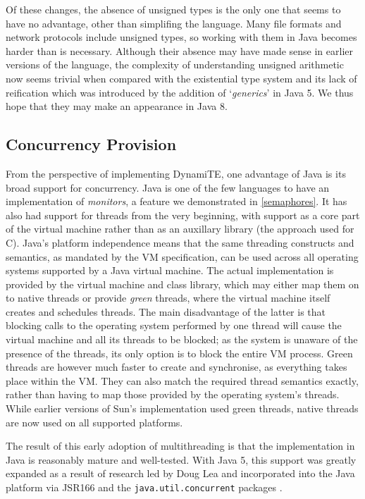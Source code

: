 Of these changes, the absence of unsigned types is the only one that
seems to have no advantage, other than simplifing the language.  Many
file formats and network protocols include unsigned types, so working
with them in Java becomes harder than is necessary.  Although their
absence may have made sense in earlier versions of the language, the
complexity of understanding unsigned arithmetic now seems trivial when
compared with the existential type system and its lack of reification
which was introduced by the addition of `\emph{generics}' in Java 5.
We thus hope that they may make an appearance in Java 8.

\subsection{Concurrency Provision}

From the perspective of implementing DynamiTE, one advantage of Java
is its broad support for concurrency.  Java is one of the few
languages to have an implementation of \emph{monitors}, a feature we
demonstrated in \ref{semaphores}.  It has also had support for threads
from the very beginning, with support as a core part of the virtual
machine rather than as an auxillary library (the approach used for C).
Java's platform independence means that the same threading constructs
and semantics, as mandated by the VM specification\cite{vmspec}, can
be used across all operating systems supported by a Java virtual
machine.  The actual implementation is provided by the virtual machine
and class library, which may either map them on to native threads or
provide \emph{green} threads, where the virtual machine itself creates
and schedules threads.  The main disadvantage of the latter is that
blocking calls to the operating system performed by one thread will
cause the virtual machine and all its threads to be blocked; as the
system is unaware of the presence of the threads, its only option is
to block the entire VM process.  Green threads are however much faster
to create and synchronise, as everything takes place within the VM.
They can also match the required thread semantics exactly, rather than
having to map those provided by the operating system's threads.  While
earlier versions of Sun's implementation used green threads, native
threads are now used on all supported platforms.

The result of this early adoption of multithreading is that the
implementation in Java is reasonably mature and well-tested.  With
Java 5, this support was greatly expanded as a result of research led
by Doug Lea and incorporated into the Java platform via JSR166 and the
\texttt{java.util.concurrent} packages \cite{jsr166, concpractice}.

